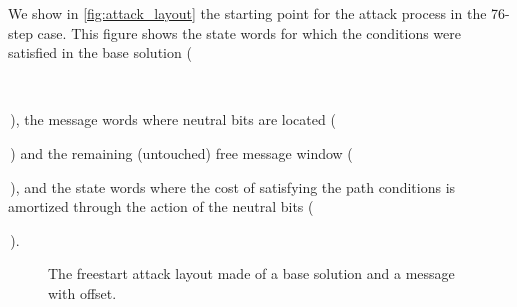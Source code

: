 We show in \autoref{fig:attack_layout} the starting point for the attack process in the 76-step case. This figure shows the state words for which the conditions were satisfied in the base solution
(\,\,\,\,),
the message words where neutral bits are located (\,\,) and the remaining (untouched) free message
window (\,\,),
and the state words where the cost of satisfying the path conditions is amortized through the action of the neutral bits (\,\,).

\begin{figure}[htb]
  \begin{center}
  
  \end{center}
  \caption{The freestart attack layout made of a base solution and a message with offset.}
  \label{fig:attack_layout}
\end{figure}
